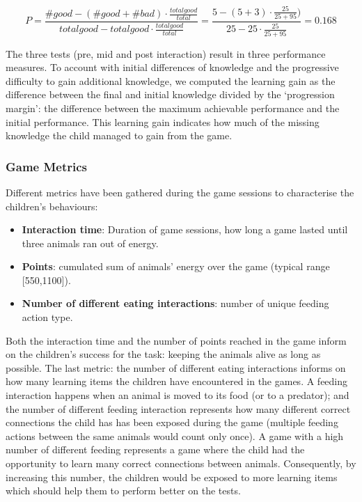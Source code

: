 \begin{equation}
P=\frac{\#good-(\#good+\#bad) \cdot \frac{total good}{total}}{total good - total good \cdot \frac{total good}{total}} = \frac{5-(5+3) \cdot \frac{25}{25+95})}{25 - 25 \cdot \frac{25}{25+95}}=0.168
\end{equation}
			
The three tests (pre, mid and post interaction) result in three performance measures. To account with initial differences of knowledge and the progressive difficulty to gain additional knowledge, we computed the learning gain as the difference between the final and initial knowledge divided by the `progression margin': the difference between the maximum achievable performance and the initial performance. This learning gain indicates how much of the missing knowledge the child managed to gain from the game.
			
\subsubsection{Game Metrics}

Different metrics have been gathered during the game sessions to characterise the children's behaviours:
\begin{itemize}
	\item \textbf{Interaction time}: Duration of game sessions, how long a game lasted until three animals ran out of energy.
	\item \textbf{Points}: cumulated sum of animals' energy over the game (typical range [550,1100]).
	\item \textbf{Number of different eating interactions}: number of unique feeding action type.
\end{itemize}

Both the interaction time and the number of points reached in the game inform on the children's success for the task: keeping the animals alive as long as possible. The last metric: the number of different eating interactions informs on how many learning items the children have encountered in the games. A feeding interaction happens when an animal is moved to its food (or to a predator); and the number of different feeding interaction represents how many different correct connections the child has has been exposed during the game (multiple feeding actions between the same animals would count only once). A game with a high number of different feeding represents a game where the child had the opportunity to learn many correct connections between animals. Consequently, by increasing this number, the children would be exposed to more learning items which should help them to perform better on the tests. 


